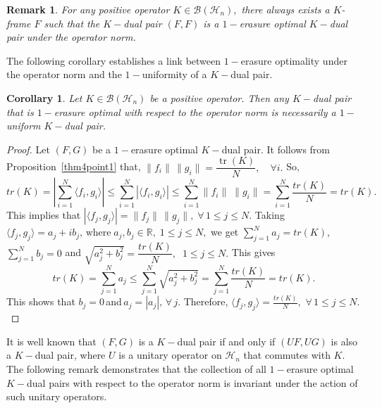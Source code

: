 \documentclass[final,1p,times]{elsarticle}
\newtheorem{rem}[thm]{Remark}
\newtheorem{cor}[thm]{Corollary}
\begin{document}
	\begin{rem}\label{Thm3point5}
For any positive operator $K \in \mathcal{B}(\mathcal{H}_n),$ there always exists a $K$-frame $F$ such that the $K-$dual pair $(F, F)$ is a $1-$erasure optimal $K-$dual pair under the operator norm.
\end{rem}



The following corollary establishes a link between $1-$erasure optimality under the operator norm and the $1-$uniformity of a $K-$dual pair.

\begin{cor}\label{cor3point5}
Let \( K \in \mathcal{B}(\mathcal{H}_n) \) be a positive operator. Then any \( K-\)dual pair that is $1-$erasure optimal with respect to the operator norm is necessarily  a $1-$uniform \( K-\)dual pair.
\end{cor}



\begin{proof}
	Let \((F, G)\) be a $1-$erasure optimal \(K-\)dual pair. It follows from Proposition~\ref{thm4point1} that, $\|f_i\| \, \|g_i\| = \dfrac{\operatorname{tr}(K)}{N}, \quad \forall i.$ So,
	$$ tr(K) = \displaystyle{\left|\sum_{i=1}^N \langle f_i , g_i \rangle \right|} \leq   \displaystyle{\sum_{i=1}^N \left| \langle f_i , g_i \rangle \right|} \leq \displaystyle{\sum_{i=1}^N \|f_i \|\; \|g_i \| } = \displaystyle{\sum_{i=1}^N \frac{tr(K)}{N} = tr(K) }.$$
	This implies that $\left| \langle f_j , g_j \rangle \right|  =   \|f_j \| \,\|g_j \|, \;\forall\, 1 \leq j\leq N.$	Taking $\langle f_j , g_j \rangle = a_j + ib_j ,\,\text{where} \;a_j,b_j \in \mathbb{R},\;  1 \leq j\leq N,$ we get  $\displaystyle{\sum_{j=1}^N a_j = tr(K) }$,  $\displaystyle{\sum_{j=1}^N b_j =0 }$ \;\;and $\sqrt{a_j^2 + b_j^2} = \dfrac{tr(K)}{N}, \;\;  1 \leq j\leq N. $	This gives
	$$ tr(K)= \displaystyle{\sum_{j=1}^N a_j } \leq  \displaystyle{\sum_{j=1}^N \sqrt{a_j^2 + b_j^2} } =  \displaystyle{\sum_{j=1}^N \frac{tr(K)}{N}} = tr(K).$$
	This shows that $b_j =0$\,and\,$a_j = |a_j|, \, \forall \,j. $ Therefore, $ \langle f_j , g_j \rangle =\frac{tr(K)}{N},$ \;$\forall \,1 \leq j \leq N.$
	
\end{proof}



\noindent It is well known that \((F, G)\) is a \(K-\)dual pair if and only if \((UF, UG)\) is also a \(K-\)dual pair, where \(U\) is a unitary operator on \(\mathcal{H}_n\) that commutes with \(K\). The following remark demonstrates that the collection of all \(1-\)erasure optimal \(K-\)dual pairs with respect to the operator norm is invariant under the action of such unitary operators.
\end{document}
